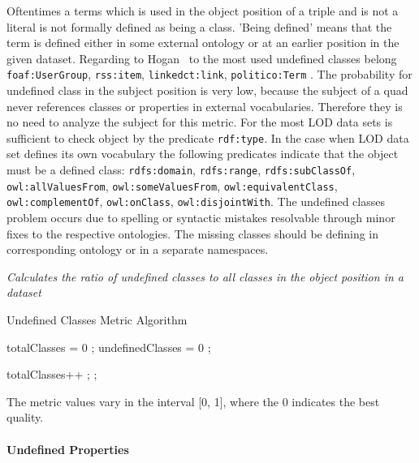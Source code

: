{{Oftentimes a terms which is used in the object position of a triple and is not a literal is not formally defined as being a class.
'Being defined' means that the term is defined either in some external ontology or at an earlier position in the given dataset. 
Regarding to Hogan~\cite{hogan2010} to the most used undefined classes belong \texttt{foaf:UserGroup}, \texttt{rss:item}, \texttt{linkedct:link}, \texttt{politico:Term} .
The probability for undefined class in the subject position is very low, because the subject of a quad never references classes or properties in external vocabularies.
Therefore they is no need to analyze the subject for this metric.
For the most LOD data sets is sufficient to check object by the predicate \texttt{rdf:type}. 
In the case when LOD data set defines its own vocabulary the following predicates indicate that the object must be a defined class:  \texttt{rdfs:domain}, \texttt{rdfs:range}, \texttt{rdfs:subClassOf}, \texttt{owl:allValuesFrom}, \texttt{owl:someValuesFrom}, \texttt{owl:equivalentClass}, \texttt{owl:complementOf}, \texttt{owl:onClass}, \texttt{owl:disjointWith}.
The undefined classes problem occurs due to spelling or syntactic mistakes resolvable through minor fixes to the respective ontologies.
The missing classes should be defining in corresponding ontology or in a separate namespaces.


\begin{mdframed}[style=metricdefinition]
\emph{Calculates the ratio of undefined classes to all classes in the object position in a dataset}
\end{mdframed}


\begin{algorithm}
\caption{Undefined Classes Metric Algorithm}\label{lst:undefCl}
\begin{algorithmic}[1]
\State totalClasses = 0 ;
\State undefinedClasses = 0 ;
\EndProcedure

  totalClasses++ ;\EndIf
{}; \EndIf
{}
\EndProcedure
\end{algorithmic}
\end{algorithm}

The metric values vary in the interval [0, 1], where  the 0 indicates the best quality.


\paragraph{Undefined Properties}  ~\\ 


}}
